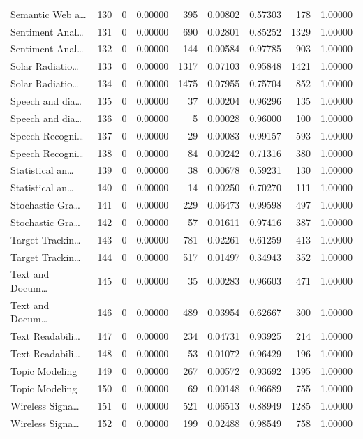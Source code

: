\begin{table}
\begin{tabular}{lrrrrrrrr}
Semantic Web a… & 130 & 0 & 0.00000 & 395 & 0.00802 & 0.57303 & 178 & 1.00000 \\
Sentiment Anal… & 131 & 0 & 0.00000 & 690 & 0.02801 & 0.85252 & 1329 & 1.00000 \\
Sentiment Anal… & 132 & 0 & 0.00000 & 144 & 0.00584 & 0.97785 & 903 & 1.00000 \\
Solar Radiatio… & 133 & 0 & 0.00000 & 1317 & 0.07103 & 0.95848 & 1421 & 1.00000 \\
Solar Radiatio… & 134 & 0 & 0.00000 & 1475 & 0.07955 & 0.75704 & 852 & 1.00000 \\
Speech and dia… & 135 & 0 & 0.00000 & 37 & 0.00204 & 0.96296 & 135 & 1.00000 \\
Speech and dia… & 136 & 0 & 0.00000 & 5 & 0.00028 & 0.96000 & 100 & 1.00000 \\
Speech Recogni… & 137 & 0 & 0.00000 & 29 & 0.00083 & 0.99157 & 593 & 1.00000 \\
Speech Recogni… & 138 & 0 & 0.00000 & 84 & 0.00242 & 0.71316 & 380 & 1.00000 \\
Statistical an… & 139 & 0 & 0.00000 & 38 & 0.00678 & 0.59231 & 130 & 1.00000 \\
Statistical an… & 140 & 0 & 0.00000 & 14 & 0.00250 & 0.70270 & 111 & 1.00000 \\
Stochastic Gra… & 141 & 0 & 0.00000 & 229 & 0.06473 & 0.99598 & 497 & 1.00000 \\
Stochastic Gra… & 142 & 0 & 0.00000 & 57 & 0.01611 & 0.97416 & 387 & 1.00000 \\
Target Trackin… & 143 & 0 & 0.00000 & 781 & 0.02261 & 0.61259 & 413 & 1.00000 \\
Target Trackin… & 144 & 0 & 0.00000 & 517 & 0.01497 & 0.34943 & 352 & 1.00000 \\
Text and Docum… & 145 & 0 & 0.00000 & 35 & 0.00283 & 0.96603 & 471 & 1.00000 \\
Text and Docum… & 146 & 0 & 0.00000 & 489 & 0.03954 & 0.62667 & 300 & 1.00000 \\
Text Readabili… & 147 & 0 & 0.00000 & 234 & 0.04731 & 0.93925 & 214 & 1.00000 \\
Text Readabili… & 148 & 0 & 0.00000 & 53 & 0.01072 & 0.96429 & 196 & 1.00000 \\
Topic Modeling & 149 & 0 & 0.00000 & 267 & 0.00572 & 0.93692 & 1395 & 1.00000 \\
Topic Modeling & 150 & 0 & 0.00000 & 69 & 0.00148 & 0.96689 & 755 & 1.00000 \\
Wireless Signa… & 151 & 0 & 0.00000 & 521 & 0.06513 & 0.88949 & 1285 & 1.00000 \\
Wireless Signa… & 152 & 0 & 0.00000 & 199 & 0.02488 & 0.98549 & 758 & 1.00000 \\
\bottomrule
\end{tabular}
\end{table}
